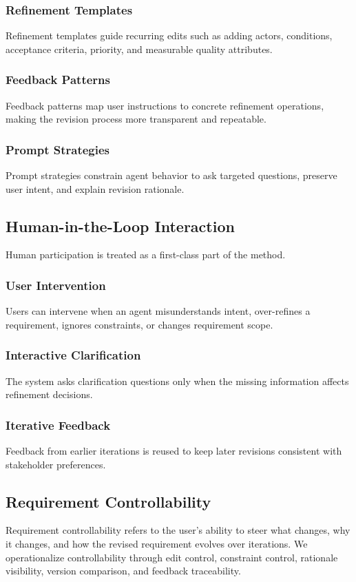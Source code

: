 \subsubsection{Refinement Templates}
\label{subsubsec:method-templates}
Refinement templates guide recurring edits such as adding actors, conditions, acceptance criteria, priority, and measurable quality attributes.

\subsubsection{Feedback Patterns}
\label{subsubsec:method-feedback-patterns}
Feedback patterns map user instructions to concrete refinement operations, making the revision process more transparent and repeatable.

\subsubsection{Prompt Strategies}
\label{subsubsec:method-prompts}
Prompt strategies constrain agent behavior to ask targeted questions, preserve user intent, and explain revision rationale.

\subsection{Human-in-the-Loop Interaction}
\label{subsec:method-hitl}
Human participation is treated as a first-class part of the method.

\subsubsection{User Intervention}
\label{subsubsec:method-intervention}
Users can intervene when an agent misunderstands intent, over-refines a requirement, ignores constraints, or changes requirement scope.

\subsubsection{Interactive Clarification}
\label{subsubsec:method-clarification}
The system asks clarification questions only when the missing information affects refinement decisions.

\subsubsection{Iterative Feedback}
\label{subsubsec:method-iterative-feedback}
Feedback from earlier iterations is reused to keep later revisions consistent with stakeholder preferences.

\subsection{Requirement Controllability}
\label{subsec:method-controllability}
Requirement controllability refers to the user's ability to steer what changes, why it changes, and how the revised requirement evolves over iterations. We operationalize controllability through edit control, constraint control, rationale visibility, version comparison, and feedback traceability.
